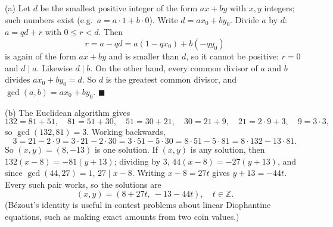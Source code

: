 (a) Let $d$ be the smallest positive integer of the form $ax+by$ with $x,y$ integers; such numbers exist (e.g.\ $a=a\cdot1+b\cdot0$). Write $d=ax_0+by_0$. Divide $a$ by $d$: $a=qd+r$ with $0\le r<d$. Then
\[
r=a-qd=a(1-qx_0)+b(-qy_0)
\]
is again of the form $ax+by$ and is smaller than $d$, so it cannot be positive: $r=0$ and $d\mid a$. Likewise $d\mid b$. On the other hand, every common divisor of $a$ and $b$ divides $ax_0+by_0=d$. So $d$ is the greatest common divisor, and $\gcd(a,b)=ax_0+by_0$. $\blacksquare$

(b) The Euclidean algorithm gives
\[
132=81+51,\quad 81=51+30,\quad 51=30+21,\quad 30=21+9,\quad 21=2\cdot9+3,\quad 9=3\cdot3,
\]
so $\gcd(132,81)=3$. Working backwards,
\[
3=21-2\cdot9=3\cdot21-2\cdot30=3\cdot51-5\cdot30=8\cdot51-5\cdot81=8\cdot132-13\cdot81 .
\]
So $(x,y)=(8,-13)$ is one solution. If $(x,y)$ is any solution, then $132(x-8)=-81(y+13)$; dividing by $3$, $44(x-8)=-27(y+13)$, and since $\gcd(44,27)=1$, $27\mid x-8$. Writing $x-8=27t$ gives $y+13=-44t$. Every such pair works, so the solutions are
\[
\boxed{(x,y)=(8+27t,\ -13-44t),\quad t\in\mathbb Z}.
\]
(B\'ezout's identity is useful in contest problems about linear Diophantine equations, such as making exact amounts from two coin values.)
